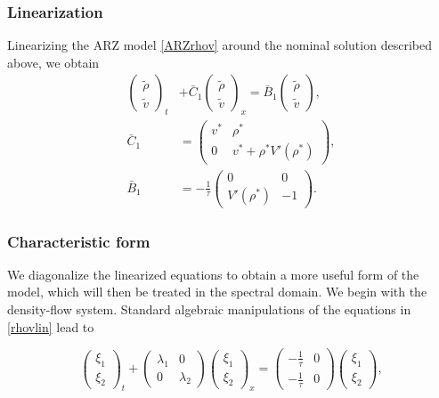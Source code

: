 \documentclass[a4paper, 10pt, conference]{ieeeconf}      %
\begin{document}
\subsubsection{Linearization}
Linearizing the ARZ model \eqref{ARZrhov} around the nominal solution described above, we obtain
\begin{subequations} \label{rhovlin}
\begin{align}
\begin{pmatrix}
	\tilde{\rho} \\
	\tilde{v}
\end{pmatrix}_t
&+ \bar{C}_1
\begin{pmatrix}
	\tilde{\rho} \\ 
	\tilde{v}
\end{pmatrix}_x 
= 
\bar{B}_1
\begin{pmatrix}
	\tilde{\rho} \\
	\tilde{v}
\end{pmatrix}, \\
\bar{C}_1
&= 
\begin{pmatrix}
	v^* & \rho^* \\
	0 & v^* + \rho^* V' ( \rho^*) 
\end{pmatrix}, \\
\bar{B}_1 
&= 
-\frac{1}{\tau}
\begin{pmatrix}
	0 & 0 \\
	V'\left( \rho^{*} \right) & -1
\end{pmatrix}.
\end{align}
\end{subequations}

\subsubsection{Characteristic form}
We diagonalize the linearized equations to obtain a more useful form of the model, which will then be treated in the spectral domain. 
We begin with the density-flow system. Standard algebraic manipulations of the equations in \eqref{rhovlin} lead to

\begin{equation}
\begin{pmatrix}
	\xi_1 \\ 
	\xi_2
\end{pmatrix}_t
+ 
\begin{pmatrix}
	\lambda_1 & 0 
	\\
	0 & \lambda_2 
\end{pmatrix}
\begin{pmatrix}
	\xi_1 \\ 
	\xi_2
\end{pmatrix}_x
= 
\begin{pmatrix}
	-\frac{1}{\tau} & 0 \\
	-\frac{1}{\tau} & 0
\end{pmatrix}
\begin{pmatrix}
\xi_1 \\ \xi_2
\end{pmatrix},
\end{equation}
\end{document}

